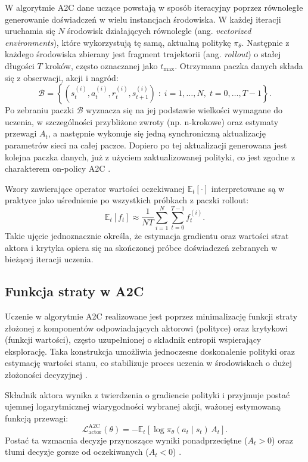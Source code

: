 W algorytmie A2C dane uczące powstają w sposób iteracyjny poprzez równoległe
generowanie doświadczeń w wielu instancjach środowiska. W każdej iteracji uruchamia się
$N$ środowisk działających równolegle (ang. \textit{vectorized environments}), które
wykorzystują tę samą, aktualną politykę $\pi_\theta$. Następnie z każdego środowiska
zbierany jest fragment trajektorii (ang. \textit{rollout}) o stałej długości $T$ kroków, często oznaczanej
jako $t_{\max}$. Otrzymana paczka danych składa się z obserwacji, akcji i nagród:
\[
\mathcal{B} = \left\{ \left(s_t^{(i)}, a_t^{(i)}, r_t^{(i)}, s_{t+1}^{(i)}\right) \;:\;
i=1,\dots,N,\; t=0,\dots,T-1 \right\}.
\]
Po zebraniu paczki $\mathcal{B}$ wyznacza się na jej podstawie wielkości wymagane do uczenia,
w szczególności przybliżone zwroty (np. n-krokowe) oraz estymaty przewagi $A_t$,
a następnie wykonuje się jedną synchroniczną aktualizację parametrów sieci na całej paczce.
Dopiero po tej aktualizacji generowana jest kolejna paczka danych, już z użyciem zaktualizowanej
polityki, co jest zgodne z charakterem on-policy A2C \cite{mnih2016,openaiBaselinesA2C}.

Wzory zawierające operator wartości oczekiwanej $\mathbb{E}_t[\cdot]$ interpretowane są w praktyce
jako uśrednienie po wszystkich próbkach z paczki rollout:
\[
\mathbb{E}_t[f_t] \approx \frac{1}{NT}\sum_{i=1}^{N}\sum_{t=0}^{T-1} f_t^{(i)}.
\]
Takie ujęcie jednoznacznie określa, że estymacja gradientu oraz wartości strat aktora i krytyka
opiera się na skończonej próbce doświadczeń zebranych w bieżącej iteracji uczenia.


\subsection*{Funkcja straty w A2C}

Uczenie w algorytmie A2C realizowane jest poprzez minimalizację funkcji straty złożonej
z komponentów odpowiadających aktorowi (polityce) oraz krytykowi (funkcji wartości),
często uzupełnionej o składnik entropii wspierający eksplorację.
Taka konstrukcja umożliwia jednoczesne doskonalenie polityki oraz estymację wartości stanu,
co stabilizuje proces uczenia w środowiskach o dużej złożoności decyzyjnej \cite{mnih2016}.

Składnik aktora wynika z twierdzenia o gradiencie polityki i przyjmuje postać ujemnej
logarytmicznej wiarygodności wybranej akcji, ważonej estymowaną funkcją przewagi:
\[
\mathcal{L}^{\text{A2C}}_{\text{actor}}(\theta)
= - \mathbb{E}_t \left[ \log \pi_\theta(a_t \mid s_t)\, A_t \right].
\]
Postać ta wzmacnia decyzje przynoszące wyniki ponadprzeciętne ($A_t>0$) oraz tłumi decyzje
gorsze od oczekiwanych ($A_t<0$) \cite{sutton2018temporal}.

